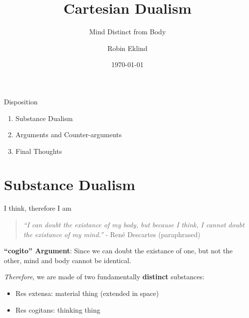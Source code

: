 \documentclass[aspectratio=1610]{beamer}
\title{Cartesian Dualism}
\subtitle{Mind Distinct from Body}
\date{\today}
\author{Robin Eklind}
\begin{document}

\maketitle


\begin{frame}{Disposition}
	\begin{enumerate}
		\item Substance Dualism
		\item Arguments and Counter-arguments
		\item Final Thoughts
	\end{enumerate}
\end{frame}


\section{Substance Dualism}


\begin{frame}{I think, therefore I am}
	\begin{quote}
		\textit{``I can doubt the existance of my body, but because I think, I cannot doubt the existance of my mind.''}
		- René Descartes {\tiny (paraphrased)}
	\end{quote}

	\pause
	\vspace{2em}

	\textbf{``cogito'' Argument}: Since we can doubt the existance of one, but not the other, mind and body cannot be identical.

	\pause
	\vspace{2em}

	\emph{Therefore}, we are made of two fundamentally \textbf{distinct} substances:
	\begin{itemize}
		\item \alert{Res extensa}: material thing (extended in space)
		\item \alert{Res cogitans}: thinking thing
	\end{itemize}

\end{frame}
\end{document}
